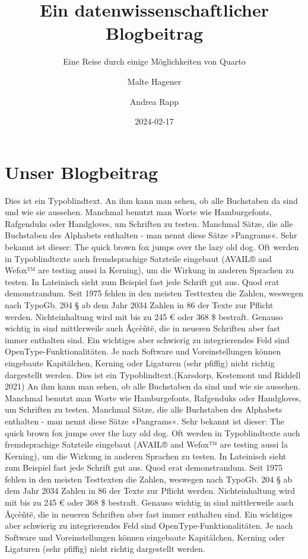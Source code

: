\documentclass[
  letterpaper,
  DIV=11]{scrartcl}
\title{Ein datenwissenschaftlicher Blogbeitrag}
\subtitle{Eine Reise durch einige Möglichkeiten von Quarto}
\author{Malte Hagener \and Andrea Rapp}
\date{2024-02-17}
\renewcommand*\contentsname{Inhaltsverzeichnis}
\newcommand\contentsname{Inhaltsverzeichnis}
\begin{document}
\maketitle

\renewcommand*\contentsname{Inhaltsverzeichnis}
{
\hypersetup{linkcolor=}
\setcounter{tocdepth}{3}
\tableofcontents
}
\section{Unser Blogbeitrag}\label{unser-blogbeitrag}

Dies ist ein Typoblindtext. An ihm kann man sehen, ob alle Buchstaben da
sind und wie sie aussehen. Manchmal benutzt man Worte wie Hamburgefonts,
Rafgenduks oder Handgloves, um Schriften zu testen. Manchmal Sätze, die
alle Buchstaben des Alphabets enthalten - man nennt diese Sätze
»Pangrams«. Sehr bekannt ist dieser: The quick brown fox jumps over the
lazy old dog. Oft werden in Typoblindtexte auch fremdsprachige Satzteile
eingebaut (AVAIL® and Wefox™ are testing aussi la Kerning), um die
Wirkung in anderen Sprachen zu testen. In Lateinisch sieht zum Beispiel
fast jede Schrift gut aus. Quod erat demonstrandum. Seit 1975 fehlen in
den meisten Testtexten die Zahlen, weswegen nach TypoGb. 204 § ab dem
Jahr 2034 Zahlen in 86 der Texte zur Pflicht werden. Nichteinhaltung
wird mit bis zu 245 € oder 368 \$ bestraft. Genauso wichtig in sind
mittlerweile auch Âçcèñtë, die in neueren Schriften aber fast immer
enthalten sind. Ein wichtiges aber schwierig zu integrierendes Feld sind
OpenType-Funktionalitäten. Je nach Software und Voreinstellungen können
eingebaute Kapitälchen, Kerning oder Ligaturen (sehr pfiffig) nicht
richtig dargestellt werden. Dies ist ein Typoblindtext.(Karsdorp,
Kestemont und Riddell 2021) An ihm kann man sehen, ob alle Buchstaben da
sind und wie sie aussehen. Manchmal benutzt man Worte wie Hamburgefonts,
Rafgenduks oder Handgloves, um Schriften zu testen. Manchmal Sätze, die
alle Buchstaben des Alphabets enthalten - man nennt diese Sätze
»Pangrams«. Sehr bekannt ist dieser: The quick brown fox jumps over the
lazy old dog. Oft werden in Typoblindtexte auch fremdsprachige Satzteile
eingebaut (AVAIL® and Wefox™ are testing aussi la Kerning), um die
Wirkung in anderen Sprachen zu testen. In Lateinisch sieht zum Beispiel
fast jede Schrift gut aus. Quod erat demonstrandum. Seit 1975 fehlen in
den meisten Testtexten die Zahlen, weswegen nach TypoGb. 204 § ab dem
Jahr 2034 Zahlen in 86 der Texte zur Pflicht werden. Nichteinhaltung
wird mit bis zu 245 € oder 368 \$ bestraft. Genauso wichtig in sind
mittlerweile auch Âçcèñtë, die in neueren Schriften aber fast immer
enthalten sind. Ein wichtiges aber schwierig zu integrierendes Feld sind
OpenType-Funktionalitäten. Je nach Software und Voreinstellungen können
eingebaute Kapitälchen, Kerning oder Ligaturen (sehr pfiffig) nicht
richtig dargestellt werden.
\end{document}
